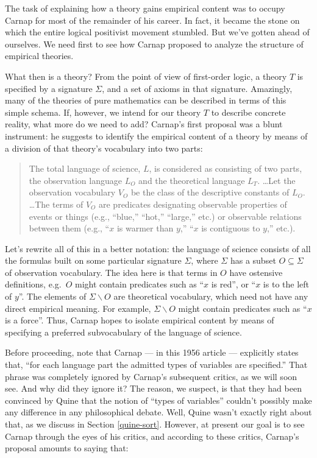 The task of explaining how a theory gains empirical content was to
occupy Carnap for most of the remainder of his career.  In fact, it
became the stone on which the entire logical positivist movement
stumbled.  But we've gotten ahead of ourselves.  We need first to see
how Carnap proposed to analyze the structure of empirical theories.

What then is a theory?  From the point of view of first-order logic, a
theory $T$ is specified by a signature $\Sigma$, and a set of axioms
in that signature.  Amazingly, many of the theories of pure
mathematics can be described in terms of this simple schema.  If,
however, we intend for our theory $T$ to describe concrete reality,
what more do we need to add?  Carnap's first proposal was a blunt
instrument: he suggests to identify the empirical content of a theory
by means of a division of that theory's vocabulary into two parts:
\begin{quote}
  The total language of science, $L$, is considered as consisting of
  two parts, the observation language $L_O$ and the theoretical
  language $L_T$. \dots Let the observation vocabulary $V_O$ be the
  class of the descriptive constants of $L_O$. \dots The terms of
  $V_O$ are predicates designating observable properties of events or
  things (e.g., ``blue,'' ``hot,'' ``large,'' etc.) or observable
  relations between them (e.g., ``$x$ is warmer than $y$,'' ``$x$ is
  contiguous to $y$,'' etc.). \citep[pp.\ 40-41]{carnap-met}
\end{quote}
Let's rewrite all of this in a better notation: the language of
science consists of all the formulas built on some particular
signature $\Sigma$, where $\Sigma$ has a subset $O\subseteq \Sigma$ of
observation vocabulary.  The idea here is that terms in $O$ have
ostensive definitions, e.g.\ $O$ might contain predicates such as
``$x$ is red'', or ``$x$ is to the left of $y$''.  The elements of
$\Sigma\backslash O$ are theoretical vocabulary, which need not have
any direct empirical meaning.  For example, $\Sigma\backslash O$ might
contain predicates such as ``$x$ is a force''.  Thus, Carnap hopes to
isolate empirical content by means of specifying a preferred
subvocabulary of the language of science.

Before proceeding, note that Carnap --- in this 1956 article ---
explicitly states that, ``for each language part the admitted types of
variables are specified.''  That phrase was completely ignored by
Carnap's subsequent critics, as we will soon see.  And why did they
ignore it?  The reason, we suspect, is that they had been convinced by
Quine that the notion of ``types of variables'' couldn't possibly make
any difference in any philosophical debate.  Well, Quine wasn't
exactly right about that, as we discuss in Section \ref{quine-sort}.
However, at present our goal is to see Carnap through the eyes of his
critics, and according to these critics, Carnap's proposal amounts to
saying that:


